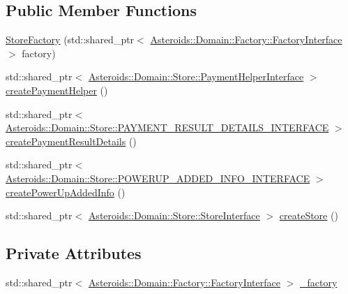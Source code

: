 \subsection*{Public Member Functions}
\begin{DoxyCompactItemize}
\item 
\hyperlink{classAsteroids_1_1Domain_1_1Store_1_1StoreFactory_a10b3738650544e33597f5dea25cc4684}{Store\+Factory} (std\+::shared\+\_\+ptr$<$ \hyperlink{classAsteroids_1_1Domain_1_1Factory_1_1FactoryInterface}{Asteroids\+::\+Domain\+::\+Factory\+::\+Factory\+Interface} $>$ factory)
\item 
std\+::shared\+\_\+ptr$<$ \hyperlink{classAsteroids_1_1Domain_1_1Store_1_1PaymentHelperInterface}{Asteroids\+::\+Domain\+::\+Store\+::\+Payment\+Helper\+Interface} $>$ \hyperlink{classAsteroids_1_1Domain_1_1Store_1_1StoreFactory_a2b705db9646ef39d911e31ddc26d2131}{create\+Payment\+Helper} ()
\item 
std\+::shared\+\_\+ptr$<$ \hyperlink{classAsteroids_1_1Domain_1_1Store_1_1PAYMENT__RESULT__DETAILS__INTERFACE}{Asteroids\+::\+Domain\+::\+Store\+::\+P\+A\+Y\+M\+E\+N\+T\+\_\+\+R\+E\+S\+U\+L\+T\+\_\+\+D\+E\+T\+A\+I\+L\+S\+\_\+\+I\+N\+T\+E\+R\+F\+A\+CE} $>$ \hyperlink{classAsteroids_1_1Domain_1_1Store_1_1StoreFactory_a5489405a1a23048570d89de58a456982}{create\+Payment\+Result\+Details} ()
\item 
std\+::shared\+\_\+ptr$<$ \hyperlink{classAsteroids_1_1Domain_1_1Store_1_1POWERUP__ADDED__INFO__INTERFACE}{Asteroids\+::\+Domain\+::\+Store\+::\+P\+O\+W\+E\+R\+U\+P\+\_\+\+A\+D\+D\+E\+D\+\_\+\+I\+N\+F\+O\+\_\+\+I\+N\+T\+E\+R\+F\+A\+CE} $>$ \hyperlink{classAsteroids_1_1Domain_1_1Store_1_1StoreFactory_a7c359274ea360991c612b3cdb87df2a2}{create\+Power\+Up\+Added\+Info} ()
\item 
std\+::shared\+\_\+ptr$<$ \hyperlink{classAsteroids_1_1Domain_1_1Store_1_1StoreInterface}{Asteroids\+::\+Domain\+::\+Store\+::\+Store\+Interface} $>$ \hyperlink{classAsteroids_1_1Domain_1_1Store_1_1StoreFactory_a5717439d93cf9fd0e799c9dd748804fd}{create\+Store} ()
\end{DoxyCompactItemize}
\subsection*{Private Attributes}
\begin{DoxyCompactItemize}
\item 
std\+::shared\+\_\+ptr$<$ \hyperlink{classAsteroids_1_1Domain_1_1Factory_1_1FactoryInterface}{Asteroids\+::\+Domain\+::\+Factory\+::\+Factory\+Interface} $>$ \hyperlink{classAsteroids_1_1Domain_1_1Store_1_1StoreFactory_aa074ae6116833b7ff3d3fb86e1ba1291}{\+\_\+factory}
\end{DoxyCompactItemize}



